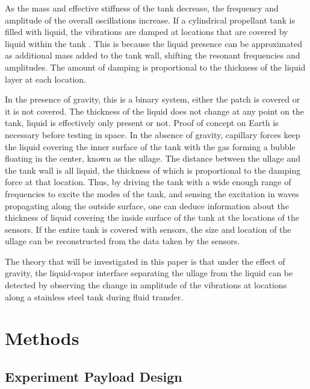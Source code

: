 \documentclass[reprint,amsmath,amssymb,aps,prb,nofootinbib,floatfix]{revtex4-2}
\begin{document}
As the mass and effective stiffness of the tank decrease, the frequency and amplitude of the overall oscillations increase. If a cylindrical propellant tank is filled with liquid, the vibrations are damped at locations that are covered by liquid within the tank \cite{BENTLEY1971179}. This is because the liquid presence can be approximated as additional mass added to the tank wall, shifting the resonant frequencies and amplitudes. The amount of damping is proportional to the thickness of the liquid layer at each location. 

In the presence of gravity, this is a binary system, either the patch is covered or it is not covered. The thickness of the liquid does not change at any point on the tank, liquid is effectively only present or not. Proof of concept on Earth is necessary before testing in space. In the absence of gravity, capillary forces keep the liquid covering the inner surface of the tank with the gas forming a bubble floating in the center, known as the ullage. The distance between the ullage and the tank wall is all liquid, the thickness of which is proportional to the damping force at that location. Thus, by driving the tank with a wide enough range of frequencies to excite the modes of the tank, and sensing the excitation in waves propagating along the outside surface, one can deduce information about the thickness of liquid covering the inside surface of the tank at the locations of the sensors. If the entire tank is covered with sensors, the size and location of the ullage can be reconstructed from the data taken by the sensors.


The theory that will be investigated in this paper is that under the effect of gravity, the liquid-vapor interface separating the ullage from the liquid can be detected by observing the change in amplitude of the vibrations at locations along a stainless steel tank during fluid transfer. 

\section{Methods}

\subsection{Experiment Payload Design}
\blinddocument
\end{document}
